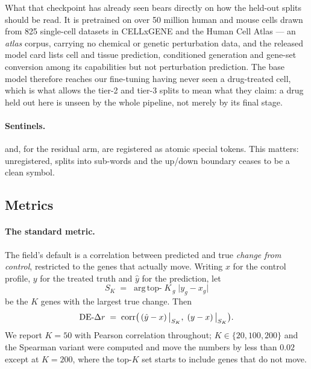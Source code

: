 What that checkpoint has already seen bears directly on how the held-out splits should be read. It
is pretrained on over 50 million human and mouse cells drawn from 825 single-cell datasets in
CELLxGENE and the Human Cell Atlas --- an \emph{atlas} corpus, carrying no chemical or genetic
perturbation data, and the released model card lists cell and tissue prediction, conditioned
generation and gene-set conversion among its capabilities but not perturbation prediction. The base
model therefore reaches our fine-tuning having never seen a drug-treated cell, which is what allows
the tier-2 and tier-3 splits to mean what they claim: a drug held out here is unseen by the whole
pipeline, not merely by its final stage.

\paragraph{Sentinels.} \ENDCELL{} and, for the residual arm, \DOWN{} are registered as atomic
special tokens. This matters: unregistered, \DOWN{} splits into sub-words and the up/down boundary
ceases to be a clean symbol.

\subsection{Metrics}
\label{sec:methods-metrics}

\paragraph{The standard metric.} The field's default is a correlation between predicted and true
\emph{change from control}, restricted to the genes that actually move. Writing $x$ for the control
profile, $y$ for the treated truth and $\hat{y}$ for the prediction, let
\begin{equation}
  S_K \;=\; \operatorname*{arg\,top-}K_{\,g} \; \lvert y_g - x_g \rvert
\end{equation}
be the $K$ genes with the largest true change. Then
\begin{equation}
  \textrm{DE-}\Delta r \;=\; \operatorname{corr}\!\big( \left(\hat{y} - x\right)\big|_{S_K}, \;
                                          \left(y - x\right)\big|_{S_K} \big).
\end{equation}
We report $K=50$ with Pearson correlation throughout; $K \in \{20, 100, 200\}$ and the Spearman
variant were computed and move the numbers by less than $0.02$ except at $K=200$, where the
top-$K$ set starts to include genes that do not move.

